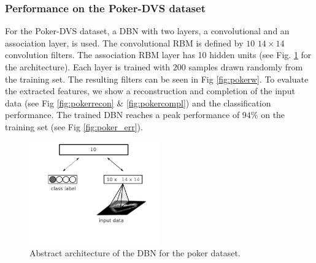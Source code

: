\clearpage

\subsubsection{Performance on the Poker-DVS dataset} \label{c:pokerexp}

For the Poker-DVS dataset, a DBN with two layers, a convolutional and an association layer, is used.
The convolutional RBM is defined by $10$ $14 \times 14$ convolution filters.
The association RBM layer has 10 hidden units (see Fig. \ref{fig:pokerdbnarch} for the architecture).
Each layer is trained with $200$ samples drawn randomly from the training set.
The resulting filters can be seen in Fig \ref{fig:pokerw}.
To evaluate the extracted features, we show a reconstruction and completion of the input data (see Fig \ref{fig:pokerrecon} \& \ref{fig:pokercompl}) and the classification performance. 
The trained DBN reaches a peak performance of $94 \%$ on the training set (see Fig \ref{fig:poker_err}).


\begin{figure}[h!]
	\centering
    	\includegraphics[width=0.5\textwidth]{imgs/poker/dbn_poker1.png} 
    \caption{Abstract architecture of the DBN for the poker dataset.}
	\label{fig:pokerdbnarch}
\end{figure}



